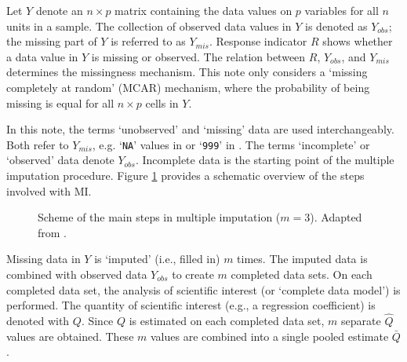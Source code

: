 \documentclass[article]{jss}
\begin{document}
Let $Y$ denote an $n \times p$ matrix containing the data values on $p$ variables for all $n$ units in a sample. The collection of observed data values in $Y$ is denoted as $Y_{obs}$; the missing part of $Y$ is referred to as $Y_{mis}$. Response indicator $R$ shows whether a data value in $Y$ is missing or observed. The relation between $R$, $Y_{obs}$, and $Y_{mis}$ determines the missingness mechanism. This note only considers a `missing completely at random' (MCAR) mechanism, where the probability of being missing is equal for all $n \times p$ cells in $Y$.

In this note, the terms `unobserved' and `missing' data are used interchangeably. Both refer to $Y_{mis}$, e.g. `\texttt{NA}' values in  or `\texttt{999}' in . The terms `incomplete' or `observed' data denote $Y_{obs}$. Incomplete data is the starting point of the multiple imputation procedure. Figure \ref{fig:steps} provides a schematic overview of the steps involved with MI.

\begin{figure}
\label{fig:steps}
\centering
	\large{}
\caption{Scheme of the main steps in multiple imputation ($m = 3$). Adapted from \citep[\S~1.4.1]{buur18}.}
\end{figure}

Missing data in $Y$ is `imputed' (i.e., filled in) $m$ times. The imputed data is combined with observed data $Y_{obs}$ to create $m$ completed data sets. On each completed data set, the analysis of scientific interest (or `complete data model') is performed. The quantity of scientific interest (e.g., a regression coefficient) is denoted with $Q$. Since $Q$ is estimated on each completed data set, $m$ separate $\hat{Q}$ values are obtained. These $m$ values are combined into a single pooled estimate $\bar{Q}$.
\end{document}
